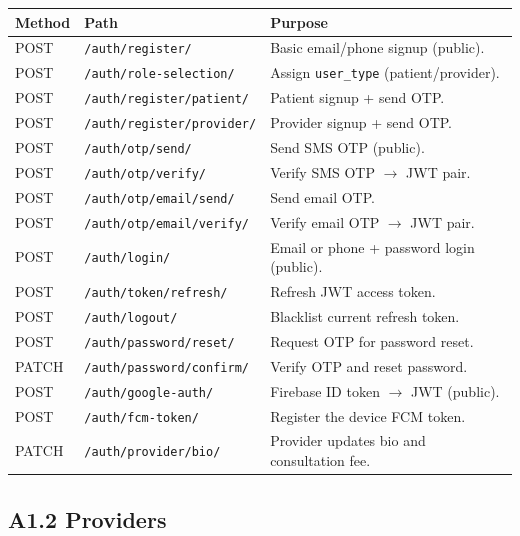 \begin{longtable}{|p{1.4cm}|p{6.5cm}|p{6.0cm}|}
\hline
\textbf{Method} & \textbf{Path} & \textbf{Purpose} \\ \hline

\endhead
POST  & \texttt{/auth/register/}                  & Basic email/phone signup (public). \\ \hline
POST  & \texttt{/auth/role-selection/}            & Assign \texttt{user\_type} (patient/provider). \\ \hline
POST  & \texttt{/auth/register/patient/}          & Patient signup + send OTP. \\ \hline
POST  & \texttt{/auth/register/provider/}         & Provider signup + send OTP. \\ \hline
POST  & \texttt{/auth/otp/send/}                  & Send SMS OTP (public). \\ \hline
POST  & \texttt{/auth/otp/verify/}                & Verify SMS OTP $\rightarrow$ JWT pair. \\ \hline
POST  & \texttt{/auth/otp/email/send/}            & Send email OTP. \\ \hline
POST  & \texttt{/auth/otp/email/verify/}          & Verify email OTP $\rightarrow$ JWT pair. \\ \hline
POST  & \texttt{/auth/login/}                     & Email or phone + password login (public). \\ \hline
POST  & \texttt{/auth/token/refresh/}             & Refresh JWT access token. \\ \hline
POST  & \texttt{/auth/logout/}                    & Blacklist current refresh token. \\ \hline
POST  & \texttt{/auth/password/reset/}            & Request OTP for password reset. \\ \hline
PATCH & \texttt{/auth/password/confirm/}          & Verify OTP and reset password. \\ \hline
POST  & \texttt{/auth/google-auth/}               & Firebase ID token $\rightarrow$ JWT (public). \\ \hline
POST  & \texttt{/auth/fcm-token/}                 & Register the device FCM token. \\ \hline
PATCH & \texttt{/auth/provider/bio/}              & Provider updates bio and consultation fee. \\ \hline

\end{longtable}

\subsection*{A1.2 Providers}

